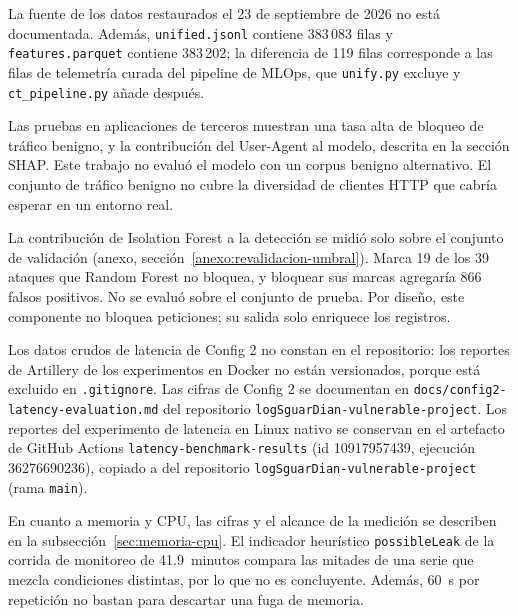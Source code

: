 La fuente de los datos restaurados el 23 de septiembre de 2026 no está documentada. Además, \texttt{unified.jsonl} contiene 383\,083 filas y \texttt{features.parquet} contiene 383\,202; la diferencia de 119 filas corresponde a las filas de telemetría curada del pipeline de MLOps, que \texttt{unify.py} excluye y \texttt{ct\_pipeline.py} añade después.

Las pruebas en aplicaciones de terceros muestran una tasa alta de bloqueo de tráfico benigno, y la contribución del User-Agent al modelo, descrita en la sección SHAP. Este trabajo no evaluó el modelo con un corpus benigno alternativo. El conjunto de tráfico benigno no cubre la diversidad de clientes HTTP que cabría esperar en un entorno real.

La contribución de Isolation Forest a la detección se midió solo sobre el conjunto de validación (anexo, sección~\ref{anexo:revalidacion-umbral}). Marca 19 de los 39 ataques que Random Forest no bloquea, y bloquear sus marcas agregaría 866 falsos positivos. No se evaluó sobre el conjunto de prueba. Por diseño, este componente no bloquea peticiones; su salida solo enriquece los registros.

Los datos crudos de latencia de Config 2 no constan en el repositorio: los reportes de Artillery de los experimentos en Docker no están versionados, porque  está excluido en \texttt{.gitignore}. Las cifras de Config 2 se documentan en \texttt{docs/config2-latency-evaluation.md} del repositorio \texttt{logSguarDian-vulnerable-project}. Los reportes del experimento de latencia en Linux nativo se conservan en el artefacto de GitHub Actions \texttt{latency-benchmark-results} (id 10917957439, ejecución 36276690236), copiado a  del repositorio \texttt{logSguarDian-vulnerable-project} (rama \texttt{main}).

En cuanto a memoria y CPU, las cifras y el alcance de la medición se describen en la subsección~\ref{sec:memoria-cpu}. El indicador heurístico \texttt{possibleLeak} de la corrida de monitoreo de 41.9~minutos compara las mitades de una serie que mezcla condiciones distintas, por lo que no es concluyente. Además, 60~s por repetición no bastan para descartar una fuga de memoria.

